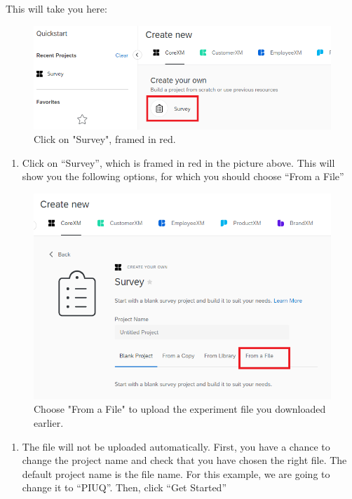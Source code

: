\documentclass[
]{book}
\providecommand{\tightlist}{%
  \setlength{\itemsep}{0pt}\setlength{\parskip}{0pt}}
\begin{document}
This will take you here:

\begin{figure}

{\centering \includegraphics[width=0.85\linewidth]{images/Qualtrics/03NewProject2} 

}

\caption{Click on "Survey", framed in red.}\label{fig:Figure11-3}
\end{figure}

\begin{enumerate}
\def\labelenumi{\arabic{enumi}.}
\setcounter{enumi}{3}
\tightlist
\item
  Click on ``Survey'', which is framed in red in the picture above. This will show you the following options, for which you should choose ``From a File''
\end{enumerate}

\begin{figure}

{\centering \includegraphics[width=0.85\linewidth]{images/Qualtrics/04FromFile} 

}

\caption{Choose "From a File" to upload the experiment file you downloaded earlier.}\label{fig:Figure11-4}
\end{figure}

\begin{enumerate}
\def\labelenumi{\arabic{enumi}.}
\setcounter{enumi}{4}
\tightlist
\item
  The file will not be uploaded automatically. First, you have a chance to change the project name and check that you have chosen the right file. The default project name is the file name. For this example, we are going to change it to ``PIUQ''. Then, click ``Get Started''
\end{enumerate}
\end{document}

